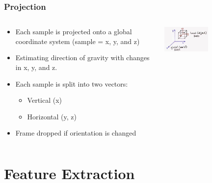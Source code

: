 \documentclass{beamer}
\begin{document}
\begin{frame}
  \frametitle{Projection}
  \begin{columns}
  \begin{column}{.7\textwidth}
  
  	\begin{itemize}
  		\item Each sample is projected onto a global coordinate system (sample = {x, y, and z})
  		\linebreak
  		\item Estimating direction of gravity with changes in x, y, and z. 
  		\linebreak
  		\item Each sample is split into two vectors: 
  			\begin{itemize}
  				\item Vertical (x)
  				\item Horizontal (y, z)
  				\linebreak
			\end{itemize}
  		\item Frame dropped if orientation is changed  
  	\end{itemize}
  
  \end{column}
  
  \begin{column}{0.7\textwidth}
   \includegraphics[width=0.5\textwidth]{Illustrations/global.jpg}
       \\
  \end{column}
  
  \end{columns}
\end{frame}




\section[Feature Extraction]{Feature Extraction}
\end{document}
